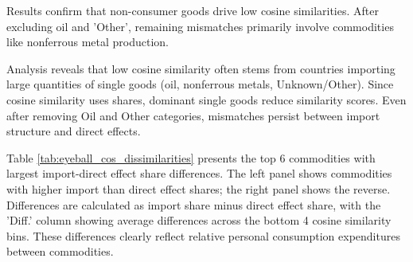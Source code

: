 \documentclass{article}
\begin{document}
Results confirm that non-consumer goods drive low cosine similarities. After excluding oil and 'Other', remaining mismatches primarily involve commodities like nonferrous metal production.

Analysis reveals that low cosine similarity often stems from countries importing large quantities of single goods (oil, nonferrous metals, Unknown/Other). Since cosine similarity uses shares, dominant single goods reduce similarity scores. Even after removing Oil and Other categories, mismatches persist between import structure and direct effects.

Table \ref{tab:eyeball_cos_dissimilarities} presents the top 6 commodities with largest import-direct effect share differences. The left panel shows commodities with higher import than direct effect shares; the right panel shows the reverse. Differences are calculated as import share minus direct effect share, with the 'Diff.' column showing average differences across the bottom 4 cosine similarity bins. These differences clearly reflect relative personal consumption expenditures between commodities.
\end{document}
